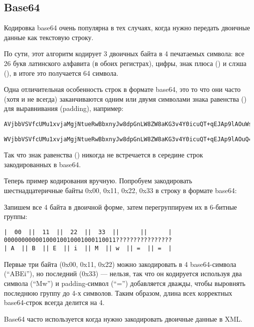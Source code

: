\subsection{Base64}

Кодировка base64 очень популярна в тех случаях, когда нужно передать двоичные данные как текстовую строку.

По сути, этот алгоритм кодирует 3 двоичных байта в 4 печатаемых символа:
все 26 букв латинского алфавита (в обоих регистрах), цифры, знак плюса (\q{+}) и слэша (\q{/}),
в итоге это получается 64 символа.

Одна отличительная особенность строк в формате base64, это то что они часто (хотя и не всегда) заканчиваются
одним или двумя символами знака равенства (\q{=}) для выравнивания (\gls{padding}), например:

\begin{lstlisting}
AVjbbVSVfcUMu1xvjaMgjNtueRwBbxnyJw8dpGnLW8ZW8aKG3v4Y0icuQT+qEJAp9lAOuWs=
\end{lstlisting}

\begin{lstlisting}
WVjbbVSVfcUMu1xvjaMgjNtueRwBbxnyJw8dpGnLW8ZW8aKG3v4Y0icuQT+qEJAp9lAOuQ==
\end{lstlisting}

Так что знак равенства (\q{=}) никогда не встречается в середине строк закодированных в base64.

Теперь пример кодирования вручную.
Попробуем закодировать шестнадцатеричные байты 0x00, 0x11, 0x22, 0x33 в строку в формате base64:



Запишем все 4 байта в двоичной форме, затем перегруппируем их в 6-битные группы:

\begin{lstlisting}
|  00  ||  11  ||  22  ||  33  ||      ||      |
00000000000100010010001000110011????????????????
| A  || B  || E  || i  || M  || w  || =  || =  |
\end{lstlisting}

Первые три байта (0x00, 0x11, 0x22) можно закодировать в 4 base64-символа (``ABEi''),
но последний (0x33) --- нельзя,
так что он кодируется используя два символа (``Mw'') и \gls{padding}-символ (``='')
добавляется дважды, чтобы выровнять последнюю группу до 4-х символов.
Таким образом, длина всех корректных base64-строк всегда делится на 4.

Base64 часто используется когда нужно закодировать двоичные данные в XML.

